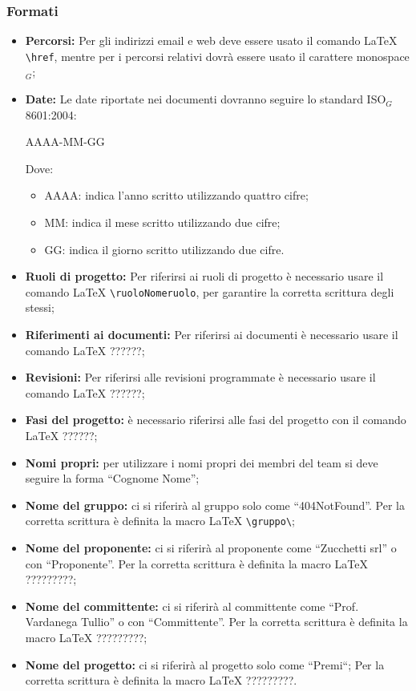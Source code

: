 \subsubsection{Formati}
\begin{itemize}
\item \textbf{Percorsi:} Per gli indirizzi email e web deve essere usato il comando \LaTeX{} \verb|\href|, mentre per i percorsi relativi dovrà essere usato il carattere monospace$_{G}$;
\item \textbf{Date:} Le date riportate nei documenti dovranno seguire lo standard ISO$_G$ 8601:2004:
\begin{center}
AAAA-MM-GG
\end{center}
Dove:
\begin{itemize}
\item AAAA: indica l'anno scritto utilizzando quattro cifre;
\item MM: indica il mese scritto utilizzando due cifre;
\item GG: indica il giorno scritto utilizzando due cifre.
\end{itemize}
\item \textbf{Ruoli di progetto:} Per riferirsi ai ruoli di progetto è necessario usare il comando \LaTeX{} \verb|\ruoloNomeruolo|, per garantire la corretta scrittura degli stessi;
\item \textbf{Riferimenti ai documenti:} Per riferirsi ai documenti è necessario usare il comando \LaTeX{} ??????;
\item \textbf{Revisioni:} Per riferirsi alle revisioni programmate è necessario usare il comando \LaTeX{} ??????;
\item \textbf{Fasi del progetto:} è necessario riferirsi alle fasi del progetto con il comando \LaTeX{}  ??????;
\item \textbf{Nomi propri:} per utilizzare i nomi propri dei membri del team si deve seguire la forma “Cognome Nome”;
\item \textbf{Nome del gruppo:} ci si riferirà al gruppo solo come “404NotFound”. Per la corretta scrittura è definita la macro \LaTeX{} \verb|\gruppo\|;
\item \textbf{Nome del proponente:} ci si riferirà al proponente come “Zucchetti srl” o con “Proponente”. Per la corretta scrittura è definita la macro \LaTeX{} ?????????;
\item \textbf{Nome del committente:} ci si riferirà al committente come “Prof. Vardanega Tullio” o con “Committente”. Per la corretta scrittura è definita la macro \LaTeX{} ?????????;
\item \textbf{Nome del progetto:} ci si riferirà al progetto solo come “Premi“; Per la corretta scrittura è definita la macro \LaTeX{} ?????????.
\end{itemize}

